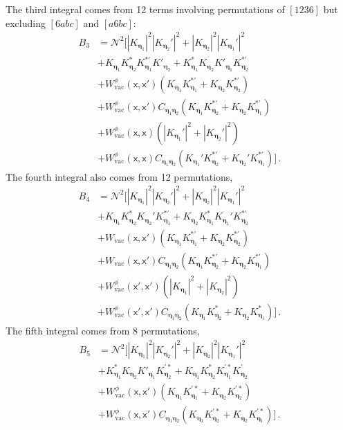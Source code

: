 \documentclass[prd,twocolumn,superscriptaddress,nofootinbib,floatfix,amsmath,amssymb]{revtex4-2}
\newcommand{\sx}{\mathsf{x}}
\newcommand{\spec}{C_{\ba\bb}}
\newcommand{\NN}{\mathcal{N}}
\newcommand{\rr}[1]{\left(#1\right)}
\newcommand{\ba}{{\bm{\eta}_1}}
\newcommand{\bb}{{\bm{\eta}_2}}
\newcommand{\vac}{\text{vac}}
\begin{document}
    The third integral comes from 12 terms involving permutations of $[1236]$ but excluding $[6abc]$ and $[a6bc]$:
    \begin{equation}
        \begin{split}
            B_3 &= {\NN}^2\bigg[|K_\ba|^2|K_\bb'|^2 + |K_\bb|^2|K_\ba'|^2 \\
            &+
            K_\ba K^*_\bb {K}^{*'}_\ba K'_\bb +  K^*_\ba K_\bb K'_\ba {K}^{*'}_\bb  \\
            &+
            W^\phi_{\vac}(\sx,\sx')\rr{K_\ba K_\ba^{*'}+K_\bb {K}^{*'}_\bb} \\
            &+
            W^\phi_{\vac}(\sx,\sx')\spec\rr{K_\ba {K}^{*'}_\bb+K_\bb K_\ba^{*'}}\\
            &+
            W_{\vac}^\phi(\sx,\sx)\left(|K_\ba'|^2+|K_\bb'|^2\right)\\
            &+             W_{\vac}^\phi(\sx,\sx)\spec\left(K_\ba'K_\bb^{*'}+K_\bb'K_\ba^{*'}\right)\bigg]\,.
        \end{split}
    \end{equation}
    The fourth integral also comes from 12 permutations,
    \begin{equation}
        \begin{split}
            B_4&= {\NN}^2\bigg[|K_\ba|^2|K_\bb'|^2 + |K_\bb|^2|K_\ba'|^2 \\
            &+ K_\ba K_\bb^* K_\bb' {K}^{*'}_\ba+K_\bb K_\ba^* K_\ba' {K}^{*'}_\bb\\
            &+
            W_{\vac}(\sx,\sx')\rr{K_\ba K_\ba^{*'}+K_\bb K_\bb^{*'}}\\
            &+
            W_{\vac}(\sx,\sx')\spec\rr{K_\ba K_\bb^{*'}+K_\bb K_\ba^{*'}}\\
            &+
            W_{\vac}^\phi(\sx',\sx')\rr{|K_\ba|^2+|K_\bb|^2}\\
            &+
            W_{\vac}^\phi(\sx',\sx')C_{\ba\bb}\rr{K_\ba K^*_\bb+K_\bb K^*_\ba}\bigg]\,.
        \end{split}
    \end{equation}
    The fifth integral comes from 8 permutations,
    \begin{equation}
    \begin{split}
        B_5 &= {\NN}^2\bigg[|K_{\ba}|^2|K_{\bb}'|^2+|K_{\bb}|^2|K_{\ba}'|^2\\
        &+ K_\ba^* K_\bb K'_\ba K^{'*}_\bb + K_\ba K^*_\bb K^{'*}_\ba K^{'}_\bb  \\
        &+ W_{\vac}^\phi(\sx,\sx')\rr{K_{\ba}K_\ba^{'*}+K_{\bb}K_\bb^{'*}}  \\
        &+ W_{\vac}^\phi(\sx,\sx')\spec\rr{K_{\ba}K_\bb^{'*}+K_{\bb}K_\ba^{'*}}\bigg] \,.
        \end{split}
    \end{equation}
\end{document}
